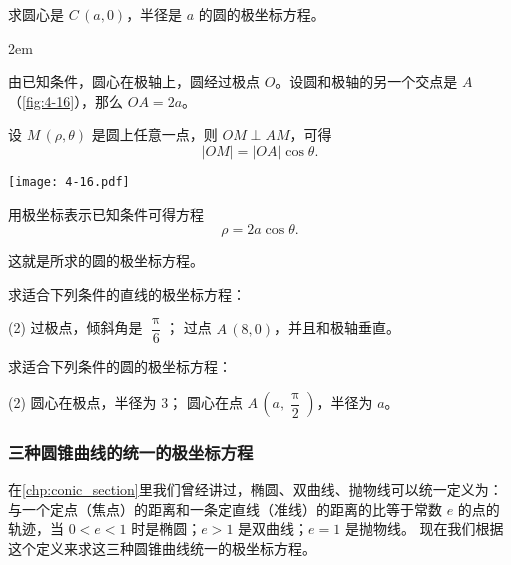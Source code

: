 \begin{example}\label{exam:circle_rho_theta}
  求圆心是 $C\,(a,0)$，半径是 $a$ 的圆的极坐标方程。
\end{example}
\noindent
\begin{minipage}{0.6\linewidth}\parindent2em
\begin{solution}
  由已知条件，圆心在极轴上，圆经过极点 $O$。设圆和极轴的另一个交点是 $A$（\cref{fig:4-16}），那么 $OA=2a$。

  设 $M\,(\rho,\theta)$ 是圆上任意一点，则 $OM\perp AM$，可得
  \[|OM|=|OA|\cos\theta.\]

  
\end{solution}
\end{minipage}\hfill
\begin{minipage}{0.35\linewidth}
\begin{figurehere}
  \texttt{[image: 4-16.pdf]}
  \caption{}\label{fig:4-16}
\end{figurehere}
\end{minipage}

\medskip
用极坐标表示已知条件可得方程
\[\rho=2a\cos\theta.\]

这就是所求的圆的极坐标方程。

\begin{Practice}
  \begin{question}
    \item 求适合下列条件的直线的极坐标方程：
    \begin{tasks}(2)
      \task 过极点，倾斜角是 $\dfrac{\uppi}{6}$；
      \task 过点 $A\,(8,0)$，并且和极轴垂直。
    \end{tasks}
    \item 求适合下列条件的圆的极坐标方程：
    \begin{tasks}(2)
      \task 圆心在极点，半径为 3；
      \task 圆心在点 $A\,\left( {a,\dfrac{\uppi}{2}}\right)$，半径为 $a$。
    \end{tasks}
  \end{question}
\end{Practice}

\subsubsection{三种圆锥曲线的统一的极坐标方程}
在\cref{chp:conic_section}里我们曾经讲过，椭圆、双曲线、抛物线可以统一定义为： 与一个定点（焦点）的距离和一条定直线（准线）的距离的比等于常数 $e$ 的点的轨迹，当 $0<e<1$ 时是椭圆；$e>1$ 是双曲线；$e=1$ 是抛物线。
现在我们根据这个定义来求这三种圆锥曲线统一的极坐标方程。

